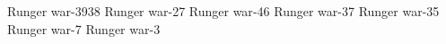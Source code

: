 \newcommand{\Dornaer}          {Dornaer\xspace} %
\newcommand{\Icor}             {Icor\xspace}   %
\newcommand{\Tiroco}           {Tiroco\xspace} %
\newcommand{\Sethgal}          {Sethgal\xspace} %

          {Runger war}{-39}{38}
        {Runger war}{-27}
       {Runger war}{-46}
        {Runger war}{-37}
       {Runger war}{-35}
         {Runger war}{-7}
         {Runger war}{-3}


\begin{comment}
\subsubsection{At the court in Malcur}
\end{comment}

\newcommand{\Risvet}           {Risvet\xspace}%

\newcommand{\Minister}         {Minister\xspace} %
\newcommand{\minister}         {minister\xspace}

\newcommand{\WimarNorden}      {Wulfwin Norden\xspace} %

\newcommand{\Kintaer}          {Kintaer\xspace} %
\newcommand{\Theal}            {Th\"eal\xspace} %
\newcommand{\Constance}        {Elfrin\xspace}  %


\begin{comment}
\subsubsection{Commoners in Malcur}
\end{comment}


\newcommand{\Urban}     {Urban\xspace}     %
\newcommand{\Brittany}  {\Piacet}          %
\newcommand{\Piacet}    {Pia\c cet\xspace}

\newcommand{\Bryon}     {Br\ydiphthong on\xspace} %
\newcommand{\Mya}       {M\ydiphthong a\xspace}   %
\newcommand{\Uswa}      {Uswa\xspace}             %

